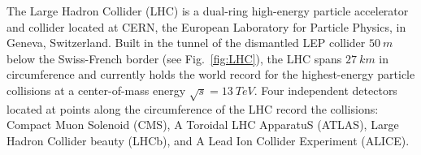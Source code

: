 The Large Hadron Collider (LHC) \cite{LHCTDR} is a dual-ring high-energy particle accelerator and collider located at CERN, the European Laboratory for Particle Physics, in Geneva, Switzerland. Built in the tunnel of the dismantled LEP collider $\SI{50}{m}$ below the Swiss-French border (see Fig.~\ref{fig:LHC}), the LHC spans $\SI{27}{km}$ in circumference and currently holds the world record for the highest-energy particle collisions at a center-of-mass energy $\sqrt{s} = \SI{13}{TeV}$. Four independent detectors located at points along the circumference of the LHC record the collisions: Compact Muon Solenoid (CMS), A Toroidal LHC ApparatuS (ATLAS), Large Hadron Collider beauty (LHCb), and A Lead Ion Collider Experiment (ALICE).

\begin{figure}[H]
    \centering
\end{figure}
